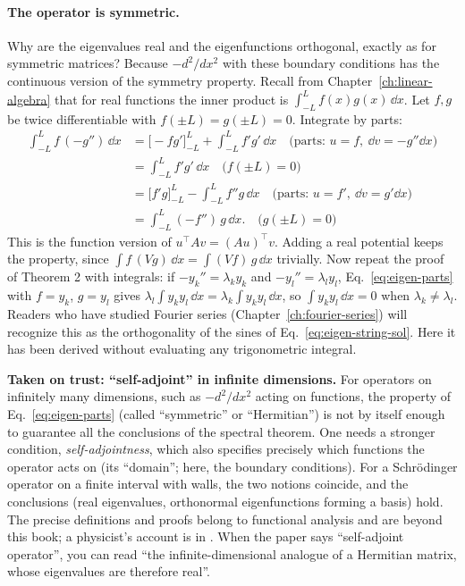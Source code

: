 \paragraph{The operator is symmetric.} Why are the eigenvalues real and the eigenfunctions orthogonal, exactly as for symmetric matrices? Because $-d^2/dx^2$ with these boundary conditions has the continuous version of the symmetry property. Recall from Chapter~\ref{ch:linear-algebra} that for real functions the inner product is $\int_{-L}^Lf(x)g(x)\,\dd x$. Let $f,g$ be twice differentiable with $f(\pm L)=g(\pm L)=0$. Integrate by parts:
\begin{align}
\int_{-L}^Lf\,(-g'')\,\dd x&=\bigl[-fg'\bigr]_{-L}^{L}+\int_{-L}^Lf'g'\,\dd x\quad\text{(parts: }u=f,\ \dd v=-g''\dd x)\\
&=\int_{-L}^Lf'g'\,\dd x\quad\text{(}f(\pm L)=0)\\
&=\bigl[f'g\bigr]_{-L}^{L}-\int_{-L}^Lf''g\,\dd x\quad\text{(parts: }u=f',\ \dd v=g'\dd x)\\
&=\int_{-L}^L(-f'')\,g\,\dd x.\quad\text{(}g(\pm L)=0)
\label{eq:eigen-parts}
\end{align}
This is the function version of $u^\top Av=(Au)^\top v$. Adding a real potential keeps the property, since $\int f\,(Vg)\,\dd x=\int(Vf)\,g\,\dd x$ trivially. Now repeat the proof of Theorem 2 with integrals: if $-y_k''=\lambda_ky_k$ and $-y_l''=\lambda_ly_l$, Eq.~\eqref{eq:eigen-parts} with $f=y_k$, $g=y_l$ gives $\lambda_l\int y_ky_l\,\dd x=\lambda_k\int y_ky_l\,\dd x$, so $\int y_ky_l\,\dd x=0$ when $\lambda_k\ne\lambda_l$. Readers who have studied Fourier series (Chapter~\ref{ch:fourier-series}) will recognize this as the orthogonality of the sines of Eq.~\eqref{eq:eigen-string-sol}. Here it has been derived without evaluating any trigonometric integral.

\begin{beyond}
\textbf{Taken on trust: ``self-adjoint'' in infinite dimensions.} For operators on infinitely many dimensions, such as $-d^2/dx^2$ acting on functions, the property of Eq.~\eqref{eq:eigen-parts} (called ``symmetric'' or ``Hermitian'') is not by itself enough to guarantee all the conclusions of the spectral theorem. One needs a stronger condition, \emph{self-adjointness}, which also specifies precisely which functions the operator acts on (its ``domain''; here, the boundary conditions). For a Schr\"odinger operator on a finite interval with walls, the two notions coincide, and the conclusions (real eigenvalues, orthonormal eigenfunctions forming a basis) hold. The precise definitions and proofs belong to functional analysis and are beyond this book; a physicist's account is in \cite{griffiths}. When the paper says ``self-adjoint operator'', you can read ``the infinite-dimensional analogue of a Hermitian matrix, whose eigenvalues are therefore real''.
\end{beyond}

